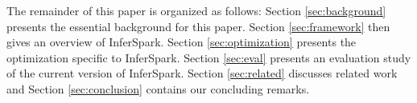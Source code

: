 %

The remainder of this paper is organized as follows: 
Section \ref{sec:background} presents the essential background for this paper.
Section \ref{sec:framework} then gives an overview of InferSpark.
Section \ref{sec:optimization} presents the optimization specific to InferSpark.
Section \ref{sec:eval} presents an evaluation study of the current version of InferSpark.
Section \ref{sec:related} discusses related work 
and Section \ref{sec:conclusion} contains our concluding remarks.



%



